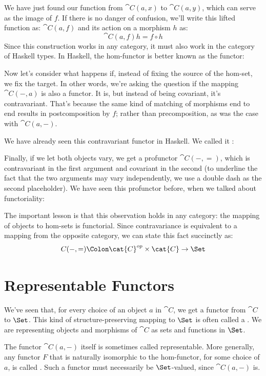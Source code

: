 \noindent
We have just found our function from $\cat{C}(a, x)$ to
$\cat{C}(a, y)$, which can serve as the image of $f$. If there
is no danger of confusion, we'll write this lifted function as: $\cat{C}(a, f)$
and its action on a morphism $h$ as:
\[\cat{C}(a, f) h = f \circ h\]
Since this construction works in any category, it must also work in the
category of Haskell types. In Haskell, the hom-functor is better known
as the  functor:


Now let's consider what happens if, instead of fixing the source of the
hom-set, we fix the target. In other words, we're asking the question if
the mapping $\cat{C}(-, a)$ is also a functor. It is, but instead of being covariant, it's
contravariant. That's because the same kind of matching of morphisms end
to end results in postcomposition by $f$; rather than
precomposition, as was the case with $\cat{C}(a, -)$.

We have already seen this contravariant functor in Haskell. We called it
:


Finally, if we let both objects vary, we get a profunctor
$\cat{C}(-, =)$, which is contravariant in the first argument and
covariant in the second (to underline the fact that the two arguments
may vary independently, we use a double dash as the second placeholder).
We have seen this profunctor before, when we talked about functoriality:

The important lesson is that this observation holds in any category: the
mapping of objects to hom-sets is functorial. Since contravariance is
equivalent to a mapping from the opposite category, we can state this
fact succinctly as:
\[C(-, =) \Colon \cat{C}^{op} \times \cat{C} \to \Set\]

\section{Representable Functors}

We've seen that, for every choice of an object $a$ in $\cat{C}$,
we get a functor from $\cat{C}$ to $\Set$. This kind of
structure-preserving mapping to $\Set$ is often called a
. We are representing objects and morphisms of
$\cat{C}$ as sets and functions in $\Set$.

The functor $\cat{C}(a, -)$ itself is sometimes called representable.
More generally, any functor $F$ that is naturally isomorphic to
the hom-functor, for some choice of $a$, is called
. Such a functor must necessarily be
$\Set$-valued, since $\cat{C}(a, -)$ is.

